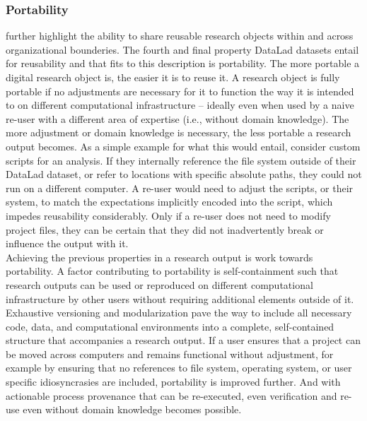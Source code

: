 \subsubsection{Portability}

\citet{bechhofer2010research} further highlight the ability to share reusable research objects within and across organizational bounderies.
The fourth and final property DataLad datasets entail for reusability and that fits to this description is portability.
The more portable a digital research object is, the easier it is to reuse it.
A research object is fully portable if no adjustments are necessary for it to function the way it is intended to on different computational infrastructure -- ideally even when used by a naive re-user with a different area of expertise (i.e., without domain knowledge).
The more adjustment or domain knowledge is necessary, the less portable a research output becomes.
As a simple example for what this would entail, consider custom scripts for an analysis.
If they internally reference the file system outside of their DataLad dataset, or refer to locations with specific absolute paths,  they could not run on a different computer.
A re-user would need to adjust the scripts, or their system, to match the expectations implicitly encoded into the script, which impedes reusability considerably.
Only if a re-user does not need to modify project files, they can be certain that they did not inadvertently break or influence the output with it.\\
Achieving the previous properties in a research output is work towards portability.
A factor contributing to portability is self-containment such that research outputs can be used or reproduced on different computational infrastructure by other users without requiring additional elements outside of it.
Exhaustive versioning and modularization pave the way to include all necessary code, data, and computational environments into a complete, self-contained structure that accompanies a research output.
If a user ensures that a project can be moved across computers and remains functional without adjustment, for example by ensuring that no references to file system, operating system, or user specific idiosyncrasies are included, portability is improved further.
And with actionable process provenance that can be re-executed, even verification and re-use even without domain knowledge becomes possible.

